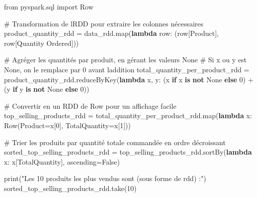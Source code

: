 \documentclass[
  letterpaper,
  DIV=11,
  numbers=noendperiod]{scrartcl}
\newenvironment{Shaded}{\begin{snugshade}}{\end{snugshade}}
\newcommand{\BuiltInTok}[1]{\textcolor[rgb]{0.00,0.23,0.31}{#1}}
\newcommand{\CommentTok}[1]{\textcolor[rgb]{0.37,0.37,0.37}{#1}}
\newcommand{\ControlFlowTok}[1]{\textcolor[rgb]{0.00,0.23,0.31}{\textbf{#1}}}
\newcommand{\DecValTok}[1]{\textcolor[rgb]{0.68,0.00,0.00}{#1}}
\newcommand{\ImportTok}[1]{\textcolor[rgb]{0.00,0.46,0.62}{#1}}
\newcommand{\KeywordTok}[1]{\textcolor[rgb]{0.00,0.23,0.31}{\textbf{#1}}}
\newcommand{\NormalTok}[1]{\textcolor[rgb]{0.00,0.23,0.31}{#1}}
\newcommand{\OperatorTok}[1]{\textcolor[rgb]{0.37,0.37,0.37}{#1}}
\newcommand{\StringTok}[1]{\textcolor[rgb]{0.13,0.47,0.30}{#1}}
\newcommand{\VariableTok}[1]{\textcolor[rgb]{0.07,0.07,0.07}{#1}}
\begin{document}
\begin{Shaded}
\begin{Highlighting}[]
\ImportTok{from}\NormalTok{ pyspark.sql }\ImportTok{import}\NormalTok{ Row}

\CommentTok{\# Transformation de l\textquotesingle{}RDD pour extraire les colonnes nécessaires}
\NormalTok{product\_quantity\_rdd }\OperatorTok{=}\NormalTok{ data\_rdd.}\BuiltInTok{map}\NormalTok{(}\KeywordTok{lambda}\NormalTok{ row: (row[}\StringTok{\textquotesingle{}Product\textquotesingle{}}\NormalTok{], row[}\StringTok{\textquotesingle{}Quantity Ordered\textquotesingle{}}\NormalTok{]))}

\CommentTok{\# Agréger les quantités par produit, en gérant les valeurs None}
\CommentTok{\# Si x ou y est None, on le remplace par 0 avant l\textquotesingle{}addition}
\NormalTok{total\_quantity\_per\_product\_rdd }\OperatorTok{=}\NormalTok{ product\_quantity\_rdd.reduceByKey(}\KeywordTok{lambda}\NormalTok{ x, y: (x }\ControlFlowTok{if}\NormalTok{ x }\KeywordTok{is} \KeywordTok{not} \VariableTok{None} \ControlFlowTok{else} \DecValTok{0}\NormalTok{) }\OperatorTok{+}\NormalTok{ (y }\ControlFlowTok{if}\NormalTok{ y }\KeywordTok{is} \KeywordTok{not} \VariableTok{None} \ControlFlowTok{else} \DecValTok{0}\NormalTok{))}

\CommentTok{\# Convertir en un RDD de Row pour un affichage facile}
\NormalTok{top\_selling\_products\_rdd }\OperatorTok{=}\NormalTok{ total\_quantity\_per\_product\_rdd.}\BuiltInTok{map}\NormalTok{(}\KeywordTok{lambda}\NormalTok{ x: Row(Product}\OperatorTok{=}\NormalTok{x[}\DecValTok{0}\NormalTok{], TotalQuantity}\OperatorTok{=}\NormalTok{x[}\DecValTok{1}\NormalTok{]))}

\CommentTok{\# Trier les produits par quantité totale commandée en ordre décroissant}
\NormalTok{sorted\_top\_selling\_products\_rdd }\OperatorTok{=}\NormalTok{ top\_selling\_products\_rdd.sortBy(}\KeywordTok{lambda}\NormalTok{ x: x[}\StringTok{\textquotesingle{}TotalQuantity\textquotesingle{}}\NormalTok{], ascending}\OperatorTok{=}\VariableTok{False}\NormalTok{)}

\BuiltInTok{print}\NormalTok{(}\StringTok{"Les 10 produits les plus vendus sont (sous forme de rdd) :"}\NormalTok{)}
\NormalTok{sorted\_top\_selling\_products\_rdd.take(}\DecValTok{10}\NormalTok{)}
\end{Highlighting}
\end{Shaded}

\begin{verbatim}
                                                                                
\end{verbatim}
\end{document}

